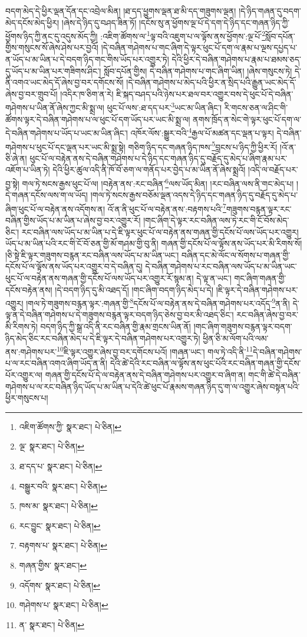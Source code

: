 བདག་མེད་དེ་ཕྱིར་ལྡན་དོན་དང་འབྲེལ་མིན། །ཐ་དད་ཕྱུགས་ལྡན་ཐ་མི་དད་གཟུགས་ལྡན། །དེ་ཉིད་གཞན་དུ་བདག་མེད་དངོས་མེད་ཕྱིར། །ཞེས་དེ་ཉིད་དུ་བཤད་ཟིན་ཏོ། །དངོས་སུ་ན་ཕྱོགས་ལྔ་པོ་དེ་དག་དེ་ཉིད་དང་གཞན་ཉིད་ཀྱི་ཕྱོགས་ཉིད་ཀྱི་ནང་དུ་འདུས་མོད་ཀྱི། :འཇིག་ཚོགས་ལ་\footnote{འཇིག་ཚོགས་ཀྱི་  སྣར་ཐང་།  པེ་ཅིན། }ལྟ་བའི་འཇུག་པ་ལ་ལྟོས་ནས་ཕྱོགས་:ལྔ་པོ་\footnote{ལྔ་  སྣར་ཐང་།  པེ་ཅིན། }སློབ་དཔོན་གྱིས་གསུངས་སོ་ཞེས་ཤེས་པར་བྱའོ། །དེ་བཞིན་གཤེགས་པ་གང་ཞིག་དེ་ལྟར་ཕུང་པོ་དག་ལ་རྣམ་པ་ལྔས་དཔྱད་པ་ན་ཡོད་པ་མ་ཡིན་པ་དེ་བདག་ཉིད་གང་གིས་ཡོད་པར་འགྱུར་ཏེ། དེའི་ཕྱིར་དེ་བཞིན་གཤེགས་པ་རྣམ་པ་ཐམས་ཅད་དུ་ཡོད་པ་མ་ཡིན་པར་གཟིགས་ཤིང་། སློབ་དཔོན་གྱིས། དེ་བཞིན་གཤེགས་པ་གང་ཞིག་ཡིན། །ཞེས་གསུངས་ཏེ། དེ་ནི་འགའ་ཡང་མེད་དོ་ཞེས་བྱ་བར་དགོངས་སོ། །དེ་བཞིན་གཤེགས་པ་མེད་པའི་ཕྱིར་ན་སྲིད་པའི་རྒྱུན་ཡང་མེད་དོ་ཞེས་བྱ་བར་གྲུབ་པོ། །འདིར་ཁ་ཅིག་ན་རེ། ཇི་སྐད་བཤད་པའི་ཉེས་པར་ཐལ་བར་འགྱུར་བས་དེ་ཕུང་པོ་དེ་བཞིན་གཤེགས་པ་ཡིན་ནོ་ཞེས་ཀྱང་མི་སྨྲ་ལ། ཕུང་པོ་ལས་:ཐ་དད་པར་\footnote{ཐ་དད་པ་  སྣར་ཐང་།  པེ་ཅིན། }ཡང་མ་ཡིན་ཞིང་། རི་གངས་ཅན་ལ་ཤིང་གི་ཚོགས་ལྟར་དེ་བཞིན་གཤེགས་པ་ལ་ཕུང་པོ་དག་ཡོད་པར་ཡང་མི་སྨྲ་ལ། ནགས་ཁྲོད་ན་སེང་གེ་ལྟར་ཕུང་པོ་དག་ལ་དེ་བཞིན་གཤེགས་པ་ཡོད་པ་ཡང་མ་ཡིན་ཞིང་། འཁོར་ལོས་:སྒྱུར་བའི་\footnote{བསྒྱུར་བའི་  སྣར་ཐང་།  པེ་ཅིན། }རྒྱལ་པོ་མཚན་དང་ལྡན་པ་ལྟར། དེ་བཞིན་གཤེགས་པ་ཕུང་པོ་དང་ལྡན་པར་ཡང་མི་སྨྲ་སྟེ། གཅིག་ཉིད་དང་གཞན་ཉིད་ཁས་\footnote{ཁས་མ་  སྣར་ཐང་།  པེ་ཅིན། }བླངས་པ་ཉིད་ཀྱི་ཕྱིར་རོ། །འོ་ན་ཅི་ཞེ་ན། ཕུང་པོ་ལ་བརྟེན་ནས་དེ་བཞིན་གཤེགས་པ་དེ་ཉིད་དང་གཞན་ཉིད་དུ་བརྗོད་དུ་མེད་པ་ཞིག་རྣམ་པར་འཇོག་པ་ཡིན་ཏེ། དེའི་ཕྱིར་ཚུལ་འདི་ནི་ཁོ་བོ་ཅག་ལ་གནོད་པར་བྱེད་པ་མ་ཡིན་ནོ་ཞེས་སྨྲའོ། །འདི་ལ་བརྗོད་པར་བྱ་སྟེ། གལ་ཏེ་སངས་རྒྱས་ཕུང་པོ་ལ། །བརྟེན་ནས་:རང་བཞིན་\footnote{རང་བྱུང་  སྣར་ཐང་།  པེ་ཅིན། }ལས་ཡོད་མིན། །རང་བཞིན་ལས་ནི་གང་མེད་པ། །དེ་གཞན་དངོས་ལས་ག་ལ་ཡོད། །གལ་ཏེ་སངས་རྒྱས་བཅོམ་ལྡན་འདས་དེ་ཉིད་དང་གཞན་ཉིད་དུ་བརྗོད་དུ་མེད་པ་ཞིག་ཕུང་པོ་ལ་བརྟེན་ནས་འདོགས་ན། འོ་ན་ནི་ཕུང་པོ་ལ་བརྟེན་ནས་:བརྟགས་པའི་\footnote{བརྟགས་པ་  སྣར་ཐང་།  པེ་ཅིན། }གཟུགས་བརྙན་ལྟར་རང་བཞིན་གྱིས་ཡོད་པ་མ་ཡིན་པ་ཞེས་བྱ་བར་འགྱུར་རོ། །གང་ཞིག་དེ་ལྟར་རང་བཞིན་ལས་ཏེ་རང་གི་ངོ་བོས་མེད་ཅིང་། རང་བཞིན་ལས་ཡོད་པ་མ་ཡིན་པ་དེ་ཇི་ལྟར་ཕུང་པོ་ལ་བརྟེན་ནས་གཞན་གྱི་དངོས་པོ་ལས་ཡོད་པར་འགྱུར། ཡོད་པ་མ་ཡིན་པའི་རང་གི་ངོ་བོ་ཅན་གྱི་མོ་གཤམ་གྱི་བུ་ནི། གཞན་གྱི་དངོས་པོ་ལ་ལྟོས་ནས་ཡོད་པར་མི་རིགས་སོ། །ཅི་སྟེ་ཇི་ལྟར་གཟུགས་བརྙན་རང་བཞིན་ལས་ཡོད་པ་མ་ཡིན་ཡང་། བཞིན་དང་མེ་ལོང་ལ་སོགས་པ་གཞན་གྱི་དངོས་པོ་ལ་ལྟོས་ནས་ཡོད་པར་འགྱུར་བ་དེ་བཞིན་དུ། དེ་བཞིན་གཤེགས་པ་རང་བཞིན་ལས་ཡོད་པ་མ་ཡིན་ཡང་ཕུང་པོ་ལ་བརྟེན་ནས་གཞན་གྱི་དངོས་པོ་ལས་ཡོད་པར་འགྱུར་རོ་སྙམ་ན། དེ་ལྟ་ན་ཡང་། གང་ཞིག་གཞན་གྱི་དངོས་བརྟེན་ནས། །དེ་བདག་ཉིད་དུ་མི་འཐད་དོ། །གང་ཞིག་བདག་ཉིད་མེད་པ་དེ། །ཇི་ལྟར་དེ་བཞིན་གཤེགས་པར་འགྱུར། །གལ་ཏེ་གཟུགས་བརྙན་ལྟར་:གཞན་གྱི་\footnote{གཞན་གྱིས་  སྣར་ཐང་། }དངོས་པོ་ལ་བརྟེན་ནས་དེ་བཞིན་གཤེགས་པར་འདོད་\footnote{འདོགས་  སྣར་ཐང་།  པེ་ཅིན། }ན་ནི། དེ་ལྟ་ན་དེ་བཞིན་གཤེགས་པ་དེ་གཟུགས་བརྙན་ལྟར་བདག་ཉིད་ཅེས་བྱ་བར་མི་འཐད་ཅིང་། རང་བཞིན་ཞེས་བྱ་བར་མི་རིགས་ཏེ། བདག་ཉིད་ཀྱི་སྒྲ་འདི་ནི་རང་བཞིན་གྱི་རྣམ་གྲངས་ཡིན་ནོ། །གང་ཞིག་གཟུགས་བརྙན་ལྟར་བདག་ཉིད་མེད་ཅིང་རང་བཞིན་མེད་པ་དེ་ཇི་ལྟར་དེ་བཞིན་གཤེགས་པར་འགྱུར་ཏེ། ཕྱིན་ཅི་མ་ལོག་པའི་ལམ་ནས་:གཤེགས་པར་\footnote{གཤེགས་པ་  སྣར་ཐང་།  པེ་ཅིན། }ཇི་ལྟར་འགྱུར་ཞེས་བྱ་བར་དགོངས་པའོ། །གཞན་ཡང་། གལ་ཏེ་འདི་ནི་\footnote{ན་  སྣར་ཐང་།  པེ་ཅིན། }དེ་བཞིན་གཤེགས་པ་ལ་རང་བཞིན་འགའ་ཞིག་ཡོད་ན་ནི། དེའི་ཚེ་དེའི་རང་བཞིན་ལ་ལྟོས་ནས་ཕུང་པོའི་རང་བཞིན་གཞན་གྱི་དངོས་པོར་འགྱུར་ལ། གཞན་གྱི་དངོས་པོ་དེ་ལ་བརྟེན་ནས་དེ་བཞིན་གཤེགས་པར་འགྱུར་བ་ཞིག་ན། གང་གི་ཚེ་དེ་བཞིན་གཤེགས་པ་ལ་རང་བཞིན་ཉིད་ཡོད་པ་མ་ཡིན་པ་དེའི་ཚེ་ཕུང་པོ་རྣམས་གཞན་ཉིད་དུ་ག་ལ་འགྱུར་ཞེས་བསྟན་པའི་ཕྱིར་གསུངས་པ། 